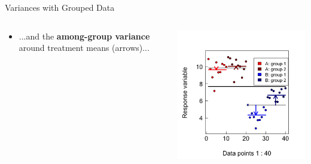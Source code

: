 \documentclass{beamer}
\begin{document}
\begin{frame}{Variances with Grouped Data}
  \begin{columns}[onlytextwidth] %
    \begin{column}{0.54\textwidth}
  \begin{itemize}
    \item ...and the \textbf{among-group variance} around treatment means (arrows)...
  \end{itemize}    \end{column}
    \hspace{0.02\textwidth} %
    \begin{column}{0.46\textwidth}
      \begin{center}
        \includegraphics[width=0.999\textwidth]{lectures/day_1_intro_to_mems/figures/unnamed-chunk-25-1.png}
      \end{center}
    \end{column}
  \end{columns}
\end{frame}
\end{document}
